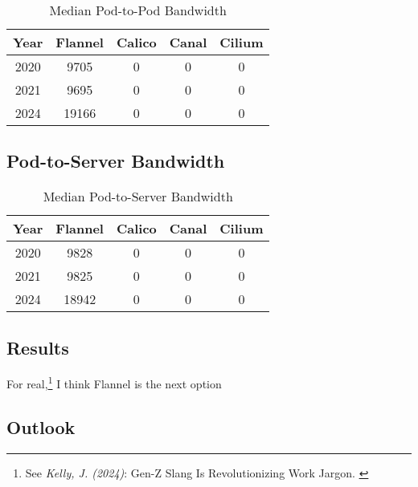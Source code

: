 \begin{table}[H]
\caption{Median Pod-to-Pod Bandwidth}
\begin{tabular}{|c | c | c | c | c|} 
 \hline
 Year & Flannel & Calico & Canal & Cilium \\
 \hline\hline
 2020 & 9705 & 0 & 0 & 0 \\ 
 \hline
 2021 & 9695 & 0 & 0 & 0 \\
 \hline
 2024 & 19166 & 0 & 0 & 0 \\
 \hline
\end{tabular}
\label{tab:p2pbw}
\end{table}

\subsection{Pod-to-Server Bandwidth}

\begin{table}[H]
\caption{Median Pod-to-Server Bandwidth}
\begin{tabular}{|c | c | c | c | c|} 
 \hline
 Year & Flannel & Calico & Canal & Cilium \\
 \hline\hline
 2020 & 9828 & 0 & 0 & 0 \\ 
 \hline
 2021 & 9825 & 0 & 0 & 0 \\
 \hline
 2024 & 18942 & 0 & 0 & 0 \\
 \hline
\end{tabular}
\label{tab:p2ebw}
\end{table}

\subsection{Results}

For real,\footnote{See \textit{Kelly, J. (2024)}: Gen-Z Slang Is Revolutionizing Work Jargon. \cite{genzSlang}} I think Flannel is the next option

\subsection{Outlook}
